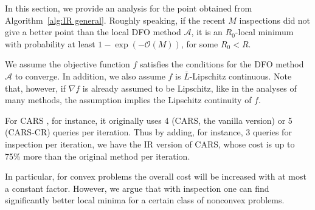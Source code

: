 
In this section, we provide an analysis for the point obtained from Algorithm~\ref{alg:IR general}.
Roughly speaking, if the recent $M$ inspections did not give a better point than the local DFO method $\mathcal{A}$, it is an $R_0$-local minimum with probability at least $1 - \exp(-\mathcal{O}(M))$, for some $R_0 < R$.

We assume the objective function $f$ satisfies the conditions for the DFO method $\mathcal{A}$ to converge. In addition, we also assume $f$ is $\bar{L}$-Lipschitz continuous. Note that, however, if $\nabla f$ is already assumed to be Lipschitz, like in the analyses of many methods, the assumption implies the Lipschitz continuity of $f$.





For CARS \cite{kim2021curvature}, for instance, it originally uses 4 (CARS, the vanilla version) or 5 (CARS-CR) queries per iteration. Thus by adding, for instance, 3 queries for inspection per iteration, we have the IR version of CARS, whose cost is up to 75\% more than the original method per iteration.

In particular, for convex problems the overall cost will be increased with at most a constant factor. However, we argue that with inspection one can find significantly better local minima for a certain class of nonconvex problems.

